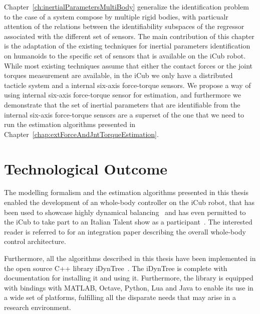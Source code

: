 Chapter~\ref{ch:inertialParametersMultiBody} generalize the identification problem to the case of a system compose by multiple rigid bodies, with particualr attention of the relations between the identifiability subspaces of the regressor associated with the different set of sensors. 
The main contribution of this chapter is the adaptation of the existing techniques for inertial parameters identification on humanoids to the specific set of sensors that is available on the iCub robot. While most existing techniques \citep{ayusawa2013,ogawa2014,Mistry2009} assume that either the contact forces or the joint torques measurement are available, in the iCub we only have a distributed tacticle system and a internal six-axis force-torque sensors. We propose a way of using internal six-axis force-torque sensor for estimation, and furthermore we demonstrate that the set of inertial parameters that are identifiable from the internal six-axis force-torque sensors are a superset of the one that we need to run the estimation algorithms presented in Chapter~\ref{chap:extForceAndJntTorqueEstimation}. 

\section{Technological Outcome}
The modelling formalism and the estimation algorithms presented in this thesis enabled the development of an whole-body controller on the iCub robot, that has been used to showcase highly dynamical balancing~\citep{pucci2016video} and has even permitted to the iCub to take part to an Italian Talent show as a participant~\citep{gotstalent}. 
The interested reader is referred to \citep{nori2015} for an integration paper describing the overall whole-body control architecture.

Furthermore, all the algorithms described in this thesis have been implemented in the open source C++ library iDynTree~\citep{idyntree}. The iDynTree is complete with documentation for installing it and using it. Furthermore, the library is equipped with bindings with MATLAB, Octave, Python, Lua and Java to enable its use in a wide set of platforms, fulfilling all the disparate needs that may arise in a research environment.  

